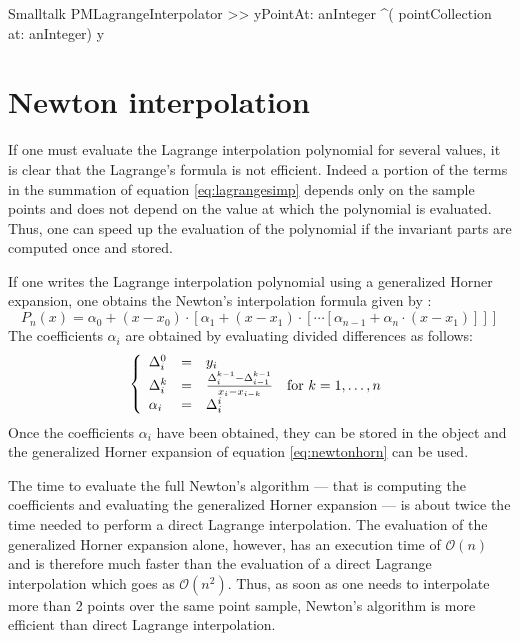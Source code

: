 \begin{displaycode}{Smalltalk}
PMLagrangeInterpolator >> yPointAt: anInteger
    ^( pointCollection at: anInteger) y
\end{displaycode}

\section{Newton interpolation}
\label{sec:newtoninterpol} If one must evaluate the Lagrange
interpolation polynomial for several values, it is clear that the
Lagrange's formula is not efficient. Indeed a portion of the terms
in the summation of equation \ref{eq:lagrangesimp} depends only on
the sample points and does not depend on the value at which the
polynomial is evaluated. Thus, one can speed up the evaluation of
the polynomial if the invariant parts are computed once and
stored.

If one writes the Lagrange interpolation polynomial using a
generalized Horner expansion, one obtains the Newton's
interpolation formula given by \cite{Knuth2}:
\begin{equation}
\label{eq:newtonhorn}P_n\left(x\right)=\alpha_0+\left(x-x_0\right)\cdot
\left[\alpha_1+\left(x-x_1\right)\cdot\left[\cdots\left[\alpha_{n-1}+\alpha_n\cdot\left(x-x_1\right)\right]\right]\right]
\end{equation}
The coefficients $\alpha_i$ are obtained by evaluating divided
differences as follows:
\begin{equation}
\label{eq:newtoncoef}\left\{ \begin{array}{lcl}\Delta_i^0 &=&y_i
\\ \Delta_i^k &=&{\Delta_i^{k-1}-\Delta_{i-1}^{k-1}\over
x_i-x_{i-k}}\mbox{\quad for $k=1,\ldots,n$}
\\ \alpha_i &=&\Delta_i^i
\end{array}\right.
\end{equation}
Once the coefficients $\alpha_i$ have been obtained, they can be
stored in the object and the generalized Horner expansion of
equation \ref{eq:newtonhorn} can be used.

The time to evaluate the full Newton's algorithm --- that is
computing the coefficients and evaluating the generalized Horner
expansion --- is about twice the time needed to perform a direct
Lagrange interpolation. The evaluation of the generalized Horner
expansion alone, however, has an execution time of $\mathcal{O}(n)$ and
is therefore much faster than the evaluation of a direct Lagrange
interpolation which goes as $\mathcal{O}(n^2)$. Thus, as soon as one needs
to interpolate more than 2 points over the same point sample,
Newton's algorithm is more efficient than direct Lagrange
interpolation.

